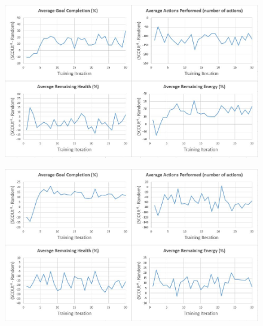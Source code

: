 \begin{appxfig}[H]
\begin{figure}[H]
  \centering
  \includegraphics[width=0.9\columnwidth]{Figures/Results/TrainingVariation2/FindHuman.JPG}
\end{figure}
\caption{Iteration testing performance results for $SCOUt_{FH}$ attempting \textit{Find Human} using setup variation 2 (see subsection~\ref{subsec:training_variations}). All graphs show the controller's average difference in performance compared to $Random$ ($SCOUt_{FH}$ average - $Random$ average) VS the number of training iterations completed.}
\label{appendix:findhuman_training_variation2}
\end{appxfig}


\begin{appxfig}[H]
\begin{figure}[H]
  \centering
  \includegraphics[width=0.9\columnwidth]{Figures/Results/TrainingVariation2/MapWater.JPG}
\end{figure}
\caption{Iteration testing performance results for $SCOUt_{MW}$ attempting \textit{Map Water} using setup variation 2 (see subsection~\ref{subsec:training_variations}). All graphs show the controller's average difference in performance compared to $Random$ ($SCOUt_{MW}$ average - $Random$ average) VS the number of training iterations completed.}
\label{appendix:mapwater_training_variation2}
\end{appxfig}


